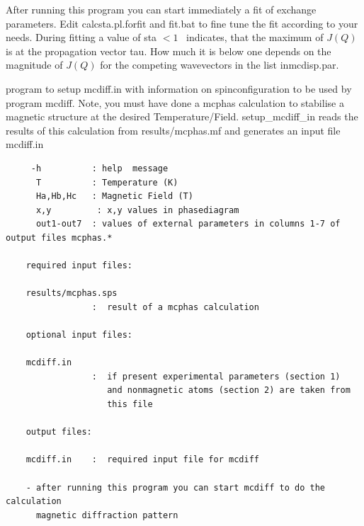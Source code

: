 \begin{description}
 After running this program you can start immediately a fit of exchange
    parameters. Edit {\prg calcsta.pl.forfit} and {\prg fit.bat} to fine tune the fit 
    according to your needs.
    During fitting a value of sta $< 1$~ indicates, that the maximum of $J(Q)$ is
    at the propagation vector tau. How much it is below one depends on the
    magnitude of $J(Q)$ for the competing wavevectors in the list in{\prg  mcdisp.par}.
\item [\prg setup\_mcdiff\_in\index{setup_mcdiff_in}\label{setup_mcdiff_in} {[option]} T Ha Hb Hc:] 
\item [\prg setup\_mcdiff\_in\index{setup_mcdiff_in} {[option]} x y:] 
\item [\prg setup\_mcdiff\_in\index{setup_mcdiff_in} {[option]} out1 out2 out3 ou4 out5 out6 out7:] 
program
 to setup {\prg mcdiff.in} with information on spinconfiguration
                    to be used by program {\prg mcdiff}. Note, you must
                    have done a {\prg mcphas} calculation to stabilise
                    a magnetic structure at the desired Temperature/Field.
                  { \prg   setup\_mcdiff\_in} reads the results of this calculation
                    from {\prg results/mcphas.mf} and generates an input file
                    {\prg mcdiff.in}

\begin{verbatim}
     -h          : help  message
      T          : Temperature (K)
      Ha,Hb,Hc   : Magnetic Field (T)
      x,y         : x,y values in phasediagram
      out1-out7  : values of external parameters in columns 1-7 of output files mcphas.*

    required input files:

    results/mcphas.sps
                 :  result of a mcphas calculation

    optional input files:

    mcdiff.in
                 :  if present experimental parameters (section 1)
                    and nonmagnetic atoms (section 2) are taken from
                    this file

    output files:

    mcdiff.in    :  required input file for mcdiff

    - after running this program you can start mcdiff to do the calculation
      magnetic diffraction pattern


\end{verbatim}
\end{description}
